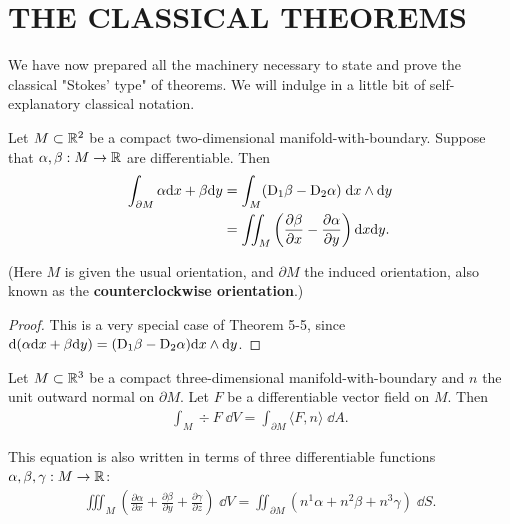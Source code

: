 \clearpage
\section[\textsc{the classical theorems}]{THE CLASSICAL THEOREMS}
We have now prepared all the machinery necessary to state and prove the 
classical "Stokes' type" of theorems. We will indulge in a little bit of 
self-explanatory classical notation.

\begin{theorem}
    Let $M \subset \mathbb{R}^2$ be a compact two-dimensional manifold-with-boundary.
    Suppose that $\alpha,\beta:M\to\mathbb{R}$ are differentiable. Then
    \begin{align*}
        \int_{\partial M}\alpha \mathrm{d} x+\beta \mathrm{d} y
        & = \int_{M}(\mathrm{D}_1\beta-\mathrm{D}_2\alpha)\;\mathrm{d} x\wedge\mathrm{d} y \\
        & = \iint_{M}\left(\frac{\partial\beta}{\partial x}-\frac{\partial\alpha}{\partial y}\right)\mathrm{d} x\mathrm{d} y.
    \end{align*}
\end{theorem}

(Here $M$ is given the usual orientation, and $\partial M$ the induced
orientation, also known as the \textbf{counterclockwise orientation}.)

\begin{proof}
    This is a very special case of Theorem 5-5, 
    since $\mathrm{d}(\alpha\mathrm{d} x + \beta\mathrm{d} y) =(\mathrm{D}_1\beta-\mathrm{D}_2\alpha)\mathrm{d} x\wedge\mathrm{d} y$.
\end{proof}

\begin{theorem}
    Let $M\subset\mathbb{R}^3$ be a compact three-dimensional manifold-with-boundary and $n$ the
    unit outward normal on $\partial M$. Let $F$ be a differentiable vector field on $M$. Then
    \begin{align*}
        \int_M\div F\;\dd V = \int_{\partial M}\langle F,n\rangle\;\dd A.
    \end{align*}

    This equation is also written in terms of three differentiable 
    functions $\alpha,\beta,\gamma:M\to\mathbb{R}$:
    \begin{align*}
        \iiint_M\left(\frac{\partial\alpha}{\partial x}+\frac{\partial\beta}{\partial y}+\frac{\partial\gamma}{\partial z}\right)\;\dd V
        = \iint_{\partial M}(n^1\alpha+n^2\beta+n^3\gamma)\;\dd S.   
    \end{align*}
\end{theorem}

